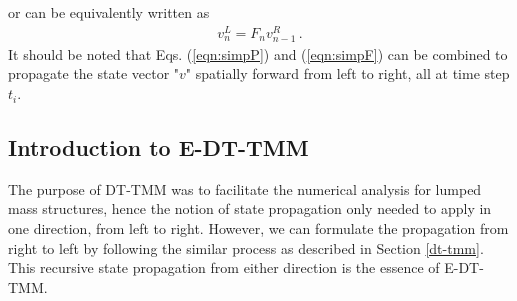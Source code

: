 \documentclass[11pt]{ucthesis}
\begin{document}
or can be equivalently written as
\begin{eqnarray}
v_n^L = F_n v_{n-1}^R \,.
\label{eqn:simpF}
\end{eqnarray}
It should be noted that Eqs. (\ref{eqn:simpP}) and (\ref{eqn:simpF}) can be combined to propagate the state vector "$v$" spatially forward from left to right, all at time step $t_i$.

\subsection{Introduction to E-DT-TMM}	\label{e-dt-tmm}
The purpose of DT-TMM \cite{kumar1986new} was to facilitate the numerical analysis for lumped mass structures, hence the notion of state propagation only needed to apply in one direction, from left to right. However, we can formulate the propagation from right to left by following the similar process as described in Section \ref{dt-tmm}. This recursive state propagation from either direction is the essence of E-DT-TMM.  
\end{document}
